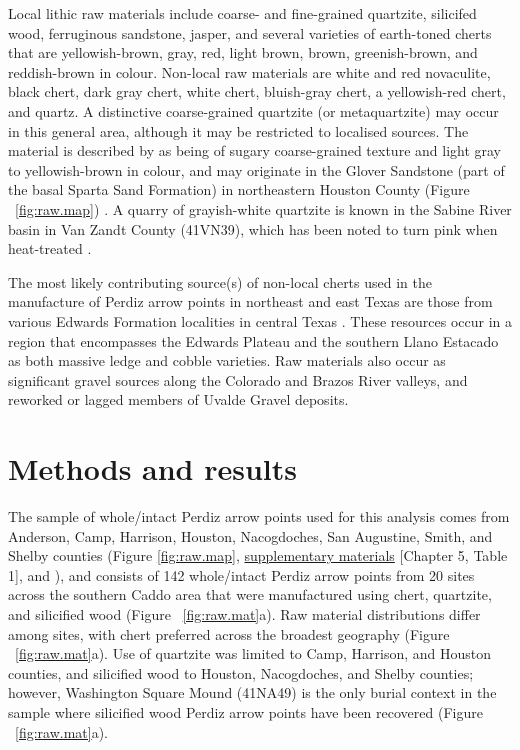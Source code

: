 \documentclass[review]{elsarticle}
\begin{document}
Local lithic raw materials include coarse- and fine-grained quartzite, silicifed wood, ferruginous sandstone, jasper, and several varieties of earth-toned cherts that are yellowish-brown, gray, red, light brown, brown, greenish-brown, and reddish-brown in colour. Non-local raw materials are white and red novaculite, black chert, dark gray chert, white chert, bluish-gray chert, a yellowish-red chert, and quartz. A distinctive coarse-grained quartzite (or metaquartzite) may occur in this general area, although it may be restricted to localised sources. The material is described by \citet[67]{RN1253} as being of sugary coarse-grained texture and light gray to yellowish-brown in colour, and may originate in the Glover Sandstone (part of the basal Sparta Sand Formation) in northeastern Houston County (Figure ~\ref{fig:raw.map}) \cite[69]{RN1253}. A quarry of grayish-white quartzite is known in the Sabine River basin in Van Zandt County (41VN39), which has been noted to turn pink when heat-treated \citep{RN1898}.

The most likely contributing source(s) of non-local cherts used in the manufacture of Perdiz arrow points in northeast and east Texas are those from various Edwards Formation localities in central Texas \citep{RN439,RN2145}. These resources occur in a region that encompasses the Edwards Plateau and the southern Llano Estacado as both massive ledge and cobble varieties. Raw materials also occur as significant gravel sources along the Colorado and Brazos River valleys, and reworked or lagged members of Uvalde Gravel deposits.

\section*{Methods and results}

The sample of whole/intact Perdiz arrow points used for this analysis comes from Anderson, Camp, Harrison, Houston, Nacogdoches, San Augustine, Smith, and Shelby counties (Figure \ref{fig:raw.map}, \href{https://aksel-blaise.github.io/perdiz/spatial.html}{supplementary materials} [Chapter 5, Table 1], and \citealt{RN8980}), and consists of 142 whole/intact Perdiz arrow points from 20 sites across the southern Caddo area that were manufactured using chert, quartzite, and silicified wood (Figure ~\ref{fig:raw.mat}a). Raw material distributions differ among sites, with chert preferred across the broadest geography (Figure ~\ref{fig:raw.mat}a). Use of quartzite was limited to Camp, Harrison, and Houston counties, and silicified wood to Houston, Nacogdoches, and Shelby counties; however, Washington Square Mound (41NA49) is the only burial context in the sample where silicified wood Perdiz arrow points have been recovered (Figure ~\ref{fig:raw.mat}a).
\end{document}
